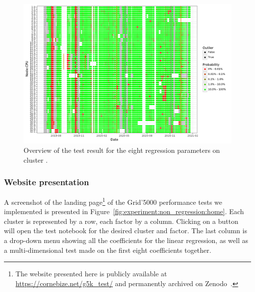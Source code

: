                 \begin{figure}[htpb]
                    \centering
                    \includegraphics[width=\linewidth]{img/experiment/non_regression/implementation/overview_multifactor.pdf}
                    \caption{Overview of the test result for the eight regression parameters on cluster \dahu.}
                    \label{fig:experiment:non_regression:overview_multifactor}
                \end{figure}

            \subsubsection{Website presentation}%

                A screenshot of the landing page\footnote{The website presented here is publicly available at
                \url{https://cornebize.net/g5k_test/} and permanently archived on Zenodo~\cite{g5k_test}.} of the
                Grid'5000 performance tests we implemented is presented in
                Figure~\ref{fig:experiment:non_regression:home}. Each cluster is represented by a row, each factor by a
                column. Clicking on a button will open the test notebook for the desired cluster and factor. The last
                column is a drop-down menu showing all the coefficients for the linear regression, as well as a
                multi-dimensional test made on the first eight coefficients together.

